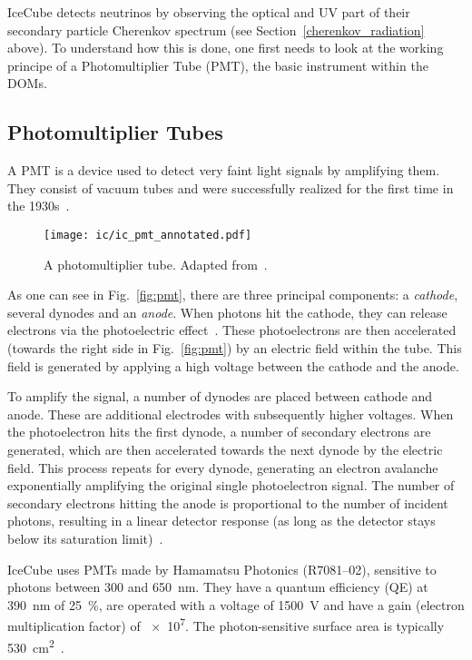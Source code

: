 IceCube detects neutrinos by observing the optical and UV part of their secondary particle Cherenkov spectrum (see Section~\ref{cherenkov_radiation} above). To understand how this is done, one first needs to look at the working principe of a Photomultiplier Tube (PMT), the basic instrument within the DOMs.

\subsection{Photomultiplier Tubes}
A PMT is a device used to detect very faint light signals by amplifying them. They consist of vacuum tubes and were successfully realized for the first time in the 1930s~.

\begin{figure}[h!]
    \texttt{[image: ic/ic\_pmt\_annotated.pdf]}
    \caption[PMT schematic]{A photomultiplier tube. Adapted from~\cite{Bednarski2014}.}
\end{figure}

As one can see in Fig.~\ref{fig:pmt}, there are three principal components: a \textit{cathode}, several dynodes and an \textit{anode}. When photons hit the cathode, they can release electrons via the photoelectric effect~. These photoelectrons are then accelerated (towards the right side in Fig.~\ref{fig:pmt}) by an electric field within the tube. This field is generated by applying a high voltage between the cathode and the anode.

To amplify the signal, a number of dynodes are placed between cathode and anode. These are additional electrodes with subsequently higher voltages. When the photoelectron hits the first dynode, a number of secondary electrons are generated, which are then accelerated towards the next dynode by the electric field. This process repeats for every dynode, generating an electron avalanche exponentially amplifying the original single photoelectron signal. The number of secondary electrons hitting the anode is proportional to the number of incident photons, resulting in a linear detector response (as long as the detector stays below its saturation limit)~.

IceCube uses PMTs made by Hamamatsu Photonics (R7081--02), sensitive to photons between 300 and \SI{650}{\nm}. They have a quantum efficiency (QE) at \SI{390}{\nm} of \SI{25}{\percent}, are operated with a voltage of \SI{1500}{\V} and have a gain (electron multiplication factor) of \num{e7}. The photon-sensitive surface area is typically \SI{530}{\cm\squared}~.

